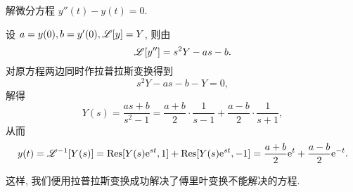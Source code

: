 \begin{example}
  解微分方程 $y''(t)-y(t)=0$.
\end{example}

\begin{solution}
  设 $a=y(0),b=y'(0),\mathscr{L}[y]=Y$, 则由\thmLDif
  \[
    \mathscr{L}[y'']=s^2Y-as-b.
  \]
  对原方程两边同时作拉普拉斯变换得到
  \[
    s^2Y-as-b-Y=0,
  \]
  解得
  \[
     Y(s)
    =\frac{as+b}{s^2-1}
    =\frac{a+b}2\cdot\frac1{s-1}+\frac{a-b}2\cdot\frac1{s+1},
  \]
  从而
  \[
     y(t)
    =\mathscr{L}^{-1}[Y(s)]
    ={\mathrm{Res}}[Y(s)\mathrm{e}^{st},1]+{\mathrm{Res}}[Y(s)\mathrm{e}^{st},-1]
    =\frac{a+b}2\mathrm{e}^t+\frac{a-b}2\mathrm{e}^{-t}.
  \]
\end{solution}

这样, 我们便用拉普拉斯变换成功解决了傅里叶变换不能解决的方程.




